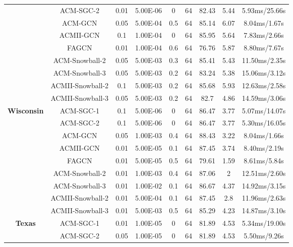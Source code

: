 \documentclass{article}
\newcommand{\0}{{\boldsymbol{0}}}
\newcommand{\6}{{\partial}}
\newcommand{\8}{{\infty}}
\newcommand{\4}{{\nabla}}
\begin{document}
\begin{table}[htbp]
{\begin{tabular}{c|c|ccccccc}
          & ACM-SGC-2 & 0.01  & 5.00E-06 & 0     & 64    & 82.43 & 5.44  & 5.93ms/25.66s \\
          & ACM-GCN & 0.05  & 5.00E-04 & 0.5   & 64    & 85.14 & 6.07  & 8.04ms/1.67s \\
          & ACMII-GCN & 0.1   & 1.00E-04 & 0     & 64    & 85.95 & 5.64  & 7.83ms/2.66s \\
          & FAGCN & 0.01  & 1.00E-04 & 0.6   & 64    & 76.76 & 5.87  & 8.80ms/7.67s \\
          & ACM-Snowball-2 & 0.05  & 5.00E-03 & 0.3   & 64    & 85.41 & 5.43  & 11.50ms/2.35s \\
          & ACM-Snowball-3 & 0.05  & 5.00E-03 & 0.2   & 64    & 83.24 & 5.38  & 15.06ms/3.12s \\
          & ACMII-Snowball-2 & 0.1   & 5.00E-03 & 0.2   & 64    & 85.68 & 5.93  & 12.63ms/2.58s \\
          & ACMII-Snowball-3 & 0.05  & 5.00E-03 & 0.2   & 64    & 82.7  & 4.86  & 14.59ms/3.06s \\
          \midrule
    \multirow{9}[0]{*}{\textbf{Wisconsin}} & ACM-SGC-1 & 0.1   & 5.00E-06 & 0     & 64    & 86.47 & 3.77  & 5.07ms/14.07s \\
          & ACM-SGC-2 & 0.1   & 5.00E-06 & 0     & 64    & 86.47 & 3.77  & 5.30ms/16.05s \\
          & ACM-GCN & 0.05  & 1.00E-03 & 0.4   & 64    & 88.43 & 3.22  & {8.04ms/1.66s} \\
          & ACMII-GCN & 0.01  & 5.00E-05 & 0.1   & 64    & 87.45 & 3.74  & 8.40ms/2.19s \\
          & FAGCN & 0.01  & 5.00E-05 & 0.5   & 64    & 79.61 & 1.59  & 8.61ms/5.84s \\
          & ACM-Snowball-2 & 0.01  & 1.00E-03 & 0.4   & 64    & 87.06 & 2     & 12.51ms/2.60s \\
          & ACM-Snowball-3 & 0.01  & 1.00E-02 & 0.1   & 64    & 86.67 & 4.37  & 14.92ms/3.15s \\
          & ACMII-Snowball-2 & 0.01  & 5.00E-04 & 0.1   & 64    & 87.45 & 2.8   & 11.96ms/2.63s \\
          & ACMII-Snowball-3 & 0.01  & 5.00E-03 & 0.5   & 64    & 85.29 & 4.23  & 14.87ms/3.10s \\
           \midrule
    \multirow{9}[0]{*}{\textbf{Texas}} & ACM-SGC-1 & 0.01  & 1.00E-05 & 0     & 64    & 81.89 & 4.53  & 5.34ms/19.00s \\
          & ACM-SGC-2 & 0.05  & 1.00E-05 & 0     & 64    & 81.89 & 4.53  & 5.50ms/9.26s \\

\end{tabular}}
\end{table}
\end{document}
